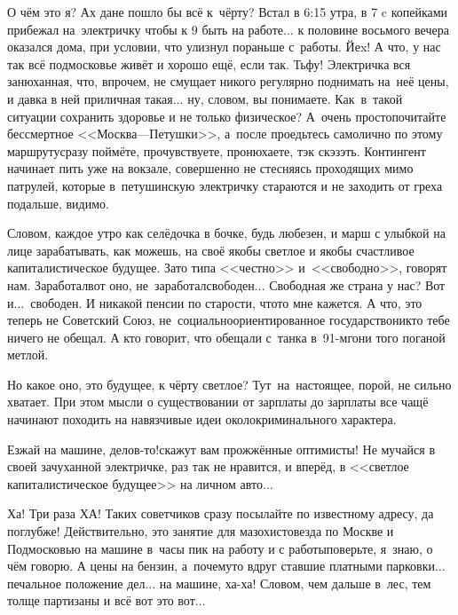 О чём это я? Ах да\mdash не пошло бы всё к~чёрту? Встал в 6:15 утра, в 7 c копейками прибежал на~электричку чтобы к 9 быть на работе$\ldots$ к половине восьмого вечера оказался дома, при условии, что улизнул пораньше с~работы. Йеx! А что, у нас так всё подмосковье живёт и хорошо ещё, если так. Тьфу! Электричка вся занюханная, что, впрочем, не смущает никого регулярно поднимать на~неё цены, и давка в ней приличная такая$\ldots$ ну, словом, вы понимаете. Как~в~такой ситуации сохранить здоровье и не только физическое? А~очень просто\mdash почитайте бессмертное <<Москва\thinspace\nobreakdash---\thinspace Петушки>>\cite{МоскваПетушки}, а~после проедьтесь самолично по этому маршруту\mdash сразу поймёте, прочувствуете, пронюхаете, тэк скэзэть. Контингент начинает пить уже на вокзале, совершенно не стесняясь проходящих мимо патрулей, которые в~петушинскую электричку стараются и не заходить от греха подальше, видимо.

Словом, каждое утро как селёдочка в бочке, будь любезен, и марш с улыбкой на лице зарабатывать, как можешь, на своё якобы светлое и якобы счастливое капиталистическое будущее. Зато типа <<честно>> и~<<свободно>>, говорят нам. Заработал\mdash вот оно, не~заработал\mdash свободен$\ldots$ Свободная же страна у нас? Вот и$\ldots$~свободен. И никакой пенсии по старости, что\sdash то мне кажется. А что, это теперь не Советский Союз, не~социально\sdash ориентированное государство\mdash никто тебе ничего не обещал. А кто говорит, что обещали с~танка в~91-м\mdash гони того поганой метлой.

Но какое оно, это будущее, к чёрту светлое? Тут~на~настоящее, порой, не сильно хватает. 
При этом мысли о существовании от зарплаты до зарплаты все чащё начинают походить на навязчивые идеи околокриминального характера.

\diagdash Езжай на машине, делов-то!\mdash скажут вам прожжённые оптимисты! \mdash Не мучайся в своей зачуханной электричке, раз так не нравится, и вперёд, в <<светлое капиталистическое будущее>> на личном авто$\ldots$ 

Ха! Три раза ХА! Таких советчиков сразу посылайте по известному адресу, да поглубже! Действительно, это занятие для мазохистов\mdash езда по Москве и Подмосковью на машине в~часы пик на работу и с работы\mdash поверьте, я~знаю, о чём говорю. А цены на бензин, а~почему\sdash то вдруг ставшие платными парковки$\ldots$ печальное положение дел$\ldots$ на машине, ха-ха! Словом, чем дальше в~лес, тем толще партизаны и всё вот это вот$\ldots$%

